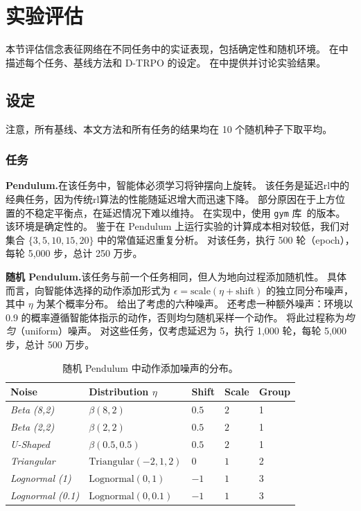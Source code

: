 \section{实验评估}
\label{sec:exp_belief}

本节评估信念表征网络在不同任务中的实证表现，包括确定性和随机环境。
在中描述每个任务、基线方法和 D-TRPO 的设定。
在中提供并讨论实验结果。

\subsection{设定}
\label{subsec:setting_exp_belief}

注意，所有基线、本文方法和所有任务的结果均在 10 个随机种子下取平均。

\subsubsection{任务}
\label{subsubsec:tasks}
\noindent\textbf{Pendulum.}\indent 在该任务中，智能体必须学习将钟摆向上旋转。
该任务是延迟\gls{rl}中的经典任务，因为传统\gls{rl}算法的性能随延迟增大而迅速下降。
部分原因在于上方位置的不稳定平衡点，在延迟情况下难以维持。
在实现中，使用 \texttt{gym} 库~\cite{brockman2016gym}的版本。
该环境是确定性的。
鉴于在 Pendulum 上运行实验的计算成本相对较低，我们对集合 $\{3, 5, 10, 15, 20\}$ 中的常值延迟重复分析。
对该任务，执行 500 轮（epoch），每轮 5,000 步，总计 250 万步。

\noindent\textbf{随机 Pendulum.}\indent 该任务与前一个任务相同，但人为地向过程添加随机性。
具体而言，向智能体选择的动作添加形式为 $\epsilon = \text{scale}( \eta+ \text{shift})$ 的独立同分布噪声，其中 $\eta$ 为某个概率分布。
给出了考虑的六种噪声。
还考虑一种额外噪声：环境以 0.9 的概率遵循智能体指示的动作，否则均匀随机采样一个动作。
将此过程称为\emph{均匀}（uniform）噪声。
对这些任务，仅考虑延迟为 5，执行 1,000 轮，每轮 5,000 步，总计 500 万步。

\begin{table}[t]
\centering
    \begin{tabular}{|l||l|l|l|l|}
        \hline
        Noise & Distribution  $\eta$ & Shift & Scale & Group \\ \hline
        \textit{Beta (8,2)}& $\beta (8,2)$ & $0.5$ & $2$ &  1\\
        \textit{Beta (2,2)} & $\beta (2,2)$ & $0.5$ & $2$ & 1\\
        \textit{U-Shaped} & $\beta (0.5,0.5)$ & $0.5$ & $2$ & 1\\
        \textit{Triangular} & $\text{Triangular} (-2,1,2)$ & $0$ & $1$ & 2\\
        \textit{Lognormal (1)} & $\text{Lognormal} (0,1)$ & $-1$ & $1$ & 3\\
        \textit{Lognormal (0.1)} & $\text{Lognormal} (0,0.1)$ & $-1$ & $1$ & 3\\
        \hline
    \end{tabular}
    \caption{随机 Pendulum 中动作添加噪声的分布。}
    \label{tab:noises}
\end{table}


